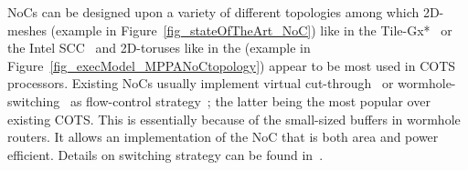 \documentclass[main.tex]{subfiles}
\begin{document}
NoCs can be designed upon a variety of different topologies among which 2D-meshes (example in Figure~\ref{fig_stateOfTheArt_NoC}) like in the Tile-Gx*~\cite{TileGx} or the Intel SCC~\cite{intel_scc} and 2D-toruses like in the \mppalong (example in Figure~\ref{fig_execModel_MPPANoCtopology}) appear to be most used in COTS processors. Existing NoCs usually implement virtual cut-through~\cite{Kermani1979} or wormhole-switching~\cite{Dally1986} as flow-control strategy~\cite{Ni1993}; the latter being the most popular over existing COTS. This is essentially because of the small-sized buffers in wormhole routers. It allows an implementation of the NoC that is both area and power efficient. Details on switching strategy can be found in~\cite[Appendix F]{HennessyPatterson}. 
\end{document}
